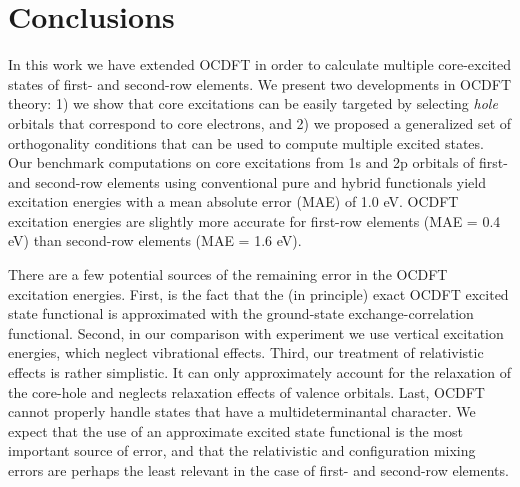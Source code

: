 \documentclass{article}
\begin{document}
\section{Conclusions}

In this work we have extended OCDFT in order to calculate multiple core-excited states of first- and second-row elements.
We present two developments in OCDFT theory: 1) we show that core excitations can be easily targeted by selecting \textit{hole} orbitals that correspond to core electrons, and 2) we proposed a generalized set of orthogonality conditions that can be used to compute multiple excited states.
Our benchmark computations on core excitations from 1s and 2p orbitals of first- and second-row elements using conventional pure and hybrid functionals yield excitation energies with a mean absolute error (MAE) of 1.0 eV.
OCDFT excitation energies are slightly more accurate for first-row elements (MAE = 0.4 eV) than second-row elements (MAE = 1.6 eV).

There are a few potential sources of the remaining error in the OCDFT excitation energies.  First, is the fact that the (in principle) exact OCDFT excited state functional is approximated with the ground-state exchange-correlation functional.
Second, in our comparison with experiment we use vertical excitation energies, which neglect vibrational effects.
Third, our treatment of relativistic effects is rather simplistic.   It can only approximately account for the relaxation of the core-hole and neglects relaxation effects of valence orbitals.  Last, OCDFT cannot properly handle states that have a multideterminantal character.
We expect that the use of an approximate excited state functional is the most important source of error, and that the relativistic and configuration mixing errors are perhaps the least relevant in the case of first- and second-row elements.
\end{document}
